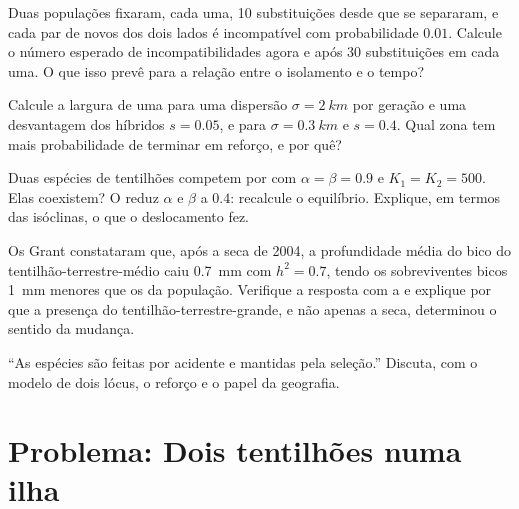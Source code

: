 \begin{exercise}[$\star\star$]\label{exo:b2:speciation:8}
Duas populações fixaram, cada uma, 10 substituições desde que se
separaram, e cada par de novos  dos dois lados é incompatível com
probabilidade $0.01$. Calcule o número esperado de incompatibilidades
agora e após 30 substituições em cada uma. O que isso prevê para a
relação entre o isolamento e o tempo?
\end{exercise}

\begin{exercise}[$\star\star$]\label{exo:b2:speciation:9}
Calcule a largura de uma  para uma dispersão $\sigma =
\qty{2}{km}$ por geração e uma desvantagem dos híbridos $s = 0.05$, e
para $\sigma = \qty{0.3}{km}$ e $s = 0.4$. Qual zona tem mais
probabilidade de terminar em reforço, e por quê?
\end{exercise}

\begin{exercise}[$\star\star\star$]\label{exo:b2:speciation:10}
Duas espécies de tentilhões competem por  com $\alpha = \beta = 0.9$ e
$K_1 = K_2 = 500$. Elas coexistem? O  reduz
$\alpha$ e $\beta$ a $0.4$: recalcule o equilíbrio. Explique, em
termos das isóclinas, o que o deslocamento fez.
\end{exercise}

\begin{exercise}[$\star\star\star$]\label{exo:b2:speciation:11}
Os Grant constataram que, após a seca de 2004, a profundidade média do
bico do tentilhão-terrestre-médio caiu \qty{0.7}{mm} com $h^{2} = 0.7$,
tendo os sobreviventes bicos \qty{1}{mm} menores que os da
população. Verifique a resposta com a  e
explique por que a presença do tentilhão-terrestre-grande, e não apenas
a seca, determinou o sentido da mudança.
\end{exercise}

\begin{exercise}[$\star\star\star$]\label{exo:b2:speciation:12}
``As espécies são feitas por acidente e mantidas pela seleção.''
Discuta, com o modelo de dois lócus, o reforço e o papel da geografia.
\end{exercise}

\section{Problema: Dois tentilhões numa ilha}

